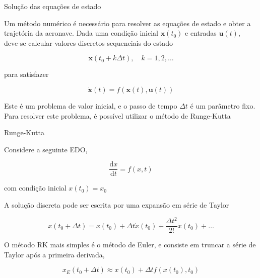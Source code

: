\documentclass{beamer}
\newcommand{\jindent}{\justifying\setlength{\parindent}{1.5em}}
\begin{document}

\begin{frame}{Solução das equações de estado}

    \jindent
    Um método numérico é necessário para resolver as equações de estado e obter a trajetória da aeronave. Dada uma condição inicial $\mathbf x(t_0)$ e entradas $\mathbf u(t)$, deve-se calcular valores discretos sequenciais do estado

    \begin{equation*}
        \mathbf x(t_0 + k\Delta t), \quad k = 1, 2, \dots
    \end{equation*}

    \justifying
    para satisfazer

    \begin{equation*}
        \dot{\mathbf x } (t) = f(\mathbf x(t), \mathbf u(t))
    \end{equation*}

    Este é um problema de valor inicial, e o passo de tempo $\Delta t$ é um parâmetro fixo. Para resolver este problema, é possível utilizar o método de Runge-Kutta
    
\end{frame}


\begin{frame}{Runge-Kutta}

    \jindent
    Considere a seguinte EDO,

    \begin{equation*}
        \frac{\mathrm dx}{\mathrm dt} = f(x,t)
    \end{equation*}

    \justifying 
    com condição inicial $x(t_0) = x_0$

    \jindent
    A solução discreta pode ser escrita por uma expansão em série de Taylor

    \begin{equation*}
        x(t_0 + \Delta t) = x(t_0) + \Delta t \dot{x}(t_0) + \frac{\Delta t ^2}{2!} \ddot{x}(t_0) + \dots
    \end{equation*}

    \jindent
    O método RK mais simples é o método de Euler, e consiste em truncar a série de Taylor após a primeira derivada,

    \begin{equation*}
        x_E(t_0+\Delta t) \approx x(t_0) + \Delta t f(x(t_0), t_0)
    \end{equation*}

    
\end{frame}
\end{document}
